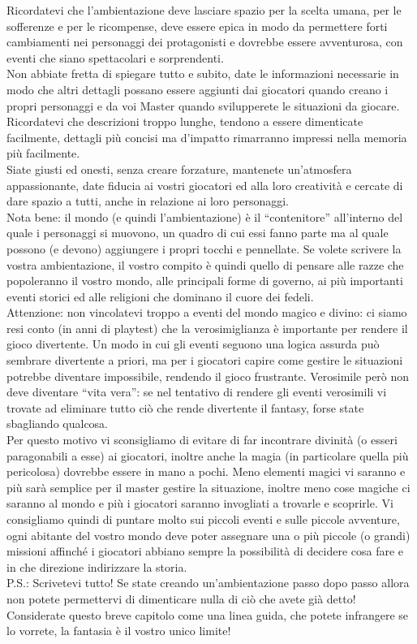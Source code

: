 \documentclass[../manuale_main.tex]{subfiles}
\begin{document}
\clearpage

Ricordatevi che l'ambientazione deve lasciare spazio per la scelta umana, per le sofferenze e per le ricompense,
deve essere epica in modo da permettere forti cambiamenti nei personaggi dei protagonisti e dovrebbe essere avventurosa, con eventi che siano spettacolari e sorprendenti.\\
Non abbiate fretta di spiegare tutto e subito, date le informazioni necessarie in modo che altri dettagli possano essere aggiunti dai giocatori quando creano i propri personaggi e da voi Master quando svilupperete le situazioni da giocare.\\
Ricordatevi che descrizioni troppo lunghe, tendono a essere dimenticate facilmente, dettagli più concisi ma d'impatto rimarranno impressi nella memoria più facilmente.\\
Siate giusti ed onesti, senza creare forzature, mantenete un’atmosfera appassionante, date fiducia ai vostri giocatori ed alla loro creatività e cercate di dare spazio a tutti, anche in relazione ai loro personaggi.\\

Nota bene: il mondo (e quindi l'ambientazione) è il ``contenitore'' all'interno del quale i personaggi si muovono, un quadro di cui essi fanno parte ma al quale possono (e devono) aggiungere i propri tocchi e pennellate. 
Se volete scrivere la vostra ambientazione, il vostro compito è quindi quello di pensare alle razze che popoleranno il vostro mondo, alle principali forme di governo, ai più importanti eventi storici ed alle religioni che dominano il cuore dei fedeli.\\

Attenzione: non vincolatevi troppo a eventi del mondo magico e divino: ci siamo resi conto (in anni di playtest) che la verosimiglianza è importante per rendere il gioco divertente. Un modo in cui gli eventi seguono una logica assurda può sembrare divertente a priori, ma per i giocatori capire come gestire le situazioni potrebbe diventare impossibile, rendendo il gioco frustrante. Verosimile però non deve diventare ``vita vera”: se nel tentativo di rendere gli eventi verosimili vi trovate ad eliminare tutto ciò che rende divertente il fantasy, forse state sbagliando qualcosa. \\
Per questo motivo vi sconsigliamo di evitare di far incontrare divinità (o esseri paragonabili a esse) ai giocatori, inoltre anche la magia (in particolare quella più pericolosa) dovrebbe essere in mano a pochi. Meno elementi magici vi saranno e più sarà semplice per il master gestire la situazione, inoltre meno cose magiche ci saranno al mondo e più i giocatori saranno invogliati a trovarle e scoprirle. Vi consigliamo quindi di puntare molto sui piccoli eventi e sulle piccole avventure, ogni abitante del vostro mondo deve poter assegnare una o più piccole (o grandi) missioni affinché i giocatori abbiano sempre la possibilità di decidere cosa fare e in che direzione indirizzare la storia.\\
P.S.: Scrivetevi tutto! Se state creando un'ambientazione passo dopo passo allora non potete permettervi di dimenticare nulla di ciò che avete già detto!\\

Considerate questo breve capitolo come una linea guida, che potete infrangere se lo vorrete, la fantasia è il vostro unico limite!
\end{document}
